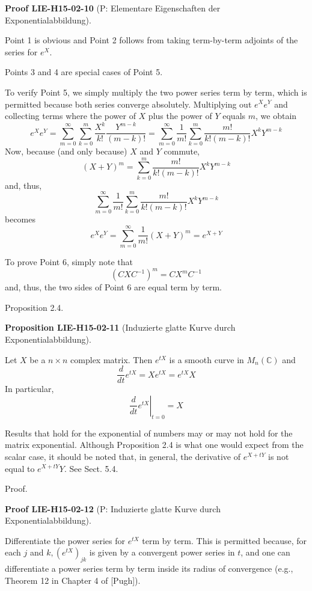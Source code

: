 \documentclass[10pt, letterpaper]{article}
\newcommand{\CustomHeading}[3]{%
  \par\medskip\noindent%
  \textbf{#1 #2} \textnormal{(#3)}.\enskip%
}
\newenvironment{PROP}[2]{\begin{unitbox}\CustomHeading{Proposition}{#1}{#2}}{\end{unitbox}}
\newenvironment{PROOF}[2]{\begin{unitbox}\CustomHeading{Proof}{#1}{#2}}{\end{unitbox}}
\begin{document}
\begin{PROOF}{LIE-H15-02-10}{P: Elementare Eigenschaften der Exponentialabbildung}
Point 1 is obvious and Point 2 follows from taking term-by-term adjoints of the series for $e^{X}$. 

Points 3 and 4 are special cases of Point 5. 

To verify Point 5, we simply multiply the two power series term by term, which is permitted because both series converge absolutely. Multiplying out $e^{X} e^{Y}$ and collecting terms where the power of $X$ plus the power of $Y$ equals $m$, we obtain
$$
e^{X} e^{Y}=\sum_{m=0}^{\infty} \sum_{k=0}^{m} \frac{X^{k}}{k!} \frac{Y^{m-k}}{(m-k)!}=\sum_{m=0}^{\infty} \frac{1}{m!} \sum_{k=0}^{m} \frac{m!}{k!(m-k)!} X^{k} Y^{m-k}
$$
Now, because (and only because) $X$ and $Y$ commute,
$$
(X+Y)^{m}=\sum_{k=0}^{m} \frac{m!}{k!(m-k)!} X^{k} Y^{m-k}
$$
and, thus, 
$$\sum_{m=0}^{\infty} \frac{1}{m!} \sum_{k=0}^m \frac{m!}{k!(m-k)!} X^k Y^{m-k}$$
becomes
$$
e^{X} e^{Y}=\sum_{m=0}^{\infty} \frac{1}{m!}(X+Y)^{m}=e^{X+Y}
$$

To prove Point 6, simply note that
$$
\left(C X C^{-1}\right)^{m}=C X^{m} C^{-1}
$$
and, thus, the two sides of Point 6 are equal term by term.
\end{PROOF}


Proposition 2.4. 


\begin{PROP}{LIE-H15-02-11}{Induzierte glatte Kurve durch Exponentialabbildung}
Let $X$ be a $n \times n$ complex matrix. Then $e^{t X}$ is a smooth curve in $M_{n}(\mathbb{C})$ and
$$
\frac{d}{d t} e^{t X}=X e^{t X}=e^{t X} X
$$
In particular,
$$
\left.\frac{d}{d t} e^{t X}\right|_{t=0}=X
$$
\end{PROP}


Results that hold for the exponential of numbers may or may not hold for the matrix exponential. Although Proposition 2.4 is what one would expect from the scalar case, it should be noted that, in general, the derivative of $e^{X+t Y}$ is not equal to $e^{X+t Y} Y$. See Sect. 5.4.

Proof. 

\begin{PROOF}{LIE-H15-02-12}{P: Induzierte glatte Kurve durch Exponentialabbildung}
Differentiate the power series for $e^{t X}$ term by term. This is permitted because, for each $j$ and $k,\left(e^{t X}\right)_{j k}$ is given by a convergent power series in $t$, and one can differentiate a power series term by term inside its radius of convergence (e.g., Theorem 12 in Chapter 4 of [Pugh]).
\end{PROOF}
\end{document}

